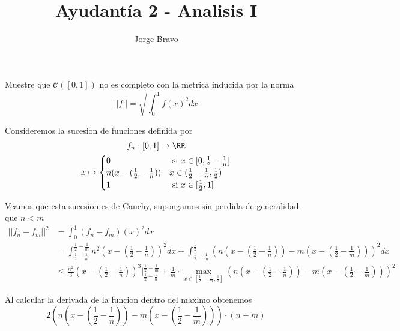 \documentclass[a4paper,oneside,10.5pt]{USMArt}
\title{Ayudantía 2 - Analisis I}
\author{Jorge Bravo}
\begin{document}
\maketitle

\begin{prob}
  Muestre que $\mathcal{C}([0, 1])$ no es completo con la metrica inducida por la norma
  \begin{equation*}
    ||f|| = \sqrt{\int_{0}^{1} f(x)^{2} dx}
  \end{equation*}
\end{prob}

\begin{sol}
  Consideremos la sucesion de funciones definida por
  \begin{gather*}
    f_{n} : [0, 1] \to \RR\\
    x \mapsto \begin{cases}
      0 & \text{ si } x \in [0, \frac{1}{2} - \frac{1}{n}]\\
      n(x - (\frac{1}{2} - \frac{1}{n})) & x \in (\frac{1}{2} - \frac{1}{n}, \frac{1}{2})\\
      1 & \text{ si } x \in [\frac{1}{2}, 1]
        \end{cases}
  \end{gather*}

  Veamos que esta sucesion es de Cauchy, supongamos sin perdida de generalidad que $n < m$
  \begin{align*}
    ||f_{n} - f_{m}||^{2} &= \int_{0}^{1} (f_{n} - f_{m})(x)^{2} dx\\
                          &= \int_{\frac{1}{2} - \frac{1}{n}}^{\frac{1}{2} - \frac{1}{m}} n^{2}(x - (\frac{1}{2} - \frac{1}{n}))^{2} dx + \int_{\frac{1}{2} - \frac{1}{m}}^{\frac{1}{2}} (n(x - (\frac{1}{2} - \frac{1}{n})) - m(x - (\frac{1}{2} - \frac{1}{m})))^{2} dx\\
                          &\leq \frac{n^{2}}{3}(x - (\frac{1}{2} - \frac{1}{n}))^{3}|_{\frac{1}{2} - \frac{1}{n}}^{\frac{1}{2} - \frac{1}{m}} + \frac{1}{m} \cdot \max_{x \in [\frac{1}{2} - \frac{1}{m}, \frac{1}{2}]} (n(x - (\frac{1}{2} - \frac{1}{n})) - m(x - (\frac{1}{2} - \frac{1}{m})))^{2}
  \end{align*}

  Al calcular la derivada de la funcion dentro del maximo obtenemos
  \begin{equation*}
    2(n(x - (\frac12 - \frac{1}{n})) - m(x - (\frac{1}{2} - \frac{1}{m}))) \cdot (n - m)
  \end{equation*}


\end{sol}
\end{document}

